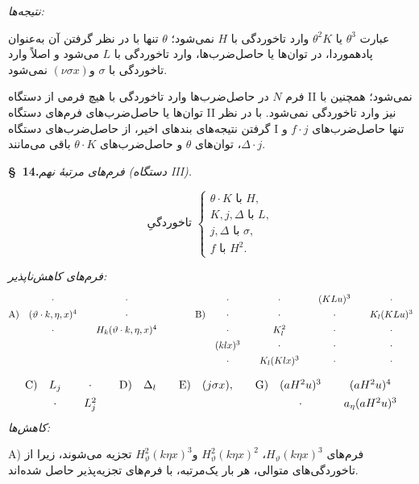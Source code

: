 \documentclass[11pt]{article}
\providecommand{\A}{\Delta}
\begin{document}
\noindent\emph{نتیجه‌ها:}

عبارت $\theta^3$ یا $\theta^2K$ وارد تاخوردگی با $H$ نمی‌شود؛ $\theta$ تنها با در نظر گرفتن آن به‌عنوان پادهموردا، در توان‌ها یا حاصل‌ضرب‌ها، وارد تاخوردگی با $L$ می‌شود و اصلاً وارد تاخوردگی با $\sigma$ و$(\nu\sigma x)$ نمی‌شود.

فرم $N$ در حاصل‌ضرب‌ها وارد تاخوردگی با هیچ فرمی از دستگاه II نمی‌شود؛ همچنین با توان‌ها یا حاصل‌ضرب‌های فرم‌های دستگاه II نیز وارد تاخوردگی نمی‌شود. با در نظر گرفتن نتیجه‌های بندهای اخیر، از حاصل‌ضرب‌های دستگاه I تنها حاصل‌ضرب‌های $f\cdot j$ و$\A\cdot j$، توان‌های $\theta$ و حاصل‌ضرب‌های $\theta\cdot K$ باقی می‌مانند.

\begin{center}
\textbf{\S\ 14.}\quad\emph{فرم‌های مرتبهٔ نهم (دستگاه III).}
\end{center}
\[
\text{تاخوردگیِ }\left\{\begin{array}{l}
\theta\cdot K\text{ با }H,\\
K,j,\A\text{ با }L,\\
j,\A\text{ با }\sigma,\\
f\text{ با }H^2.
\end{array}\right.
\]


\noindent\emph{فرم‌های کاهش‌ناپذیر:}
\[
\renewcommand{\arraystretch}{1.35}
\begin{array}{@{}r@{\quad}c@{\qquad}c@{\qquad\qquad}r@{\quad}c@{\qquad}c@{\qquad}c@{\qquad}c@{}}
&\cdot&\cdot&&\cdot&\cdot&(KLu)^3&\cdot\\
\text{A)}&(\vartheta\cdot k,\eta,x)^4&\cdot&\text{B)}&\cdot&\cdot&\cdot&K_l(KLu)^3\\
&\cdot&H_k(\vartheta\cdot k,\eta,x)^4&&\cdot&K_l^2&\cdot&\cdot\\
&&&& (klx)^3&\cdot&\cdot&\cdot\\
&&&&\cdot&K_l(Klx)^3&\cdot&\cdot
\end{array}
\]
\[
\renewcommand{\arraystretch}{1.35}
\begin{array}{@{}r@{\quad}c@{\qquad}c@{\qquad}r@{\quad}c@{\qquad}r@{\quad}c@{\qquad}r@{\quad}c@{\qquad}c@{}}
\text{C)}&L_j&\cdot&\text{D)}&\A_l&\text{E)}&(j\sigma x),&\text{G)}&(aH^2u)^3&(aH^2u)^4\\
&\cdot&L_j^2&&&&&&\cdot&a_\eta(aH^2u)^3
\end{array}
\]
\noindent\emph{کاهش‌ها:}

A) فرم‌های $H_\vartheta(k\eta x)^3$، $H_\vartheta^2(k\eta x)^2$ و$H_\vartheta^2(k\eta x)^3$ تجزیه می‌شوند، زیرا از تاخوردگی‌های متوالی، هر بار یک‌مرتبه، با فرم‌های تجزیه‌پذیر حاصل شده‌اند.
\end{document}
